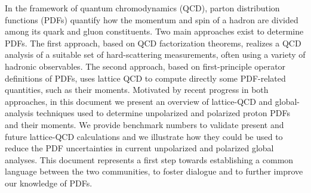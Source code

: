 \documentclass[twoside,12pt]{article}
\numberwithin{equation}{section}
\numberwithin{figure}{section}
\numberwithin{table}{section}
\begin{document}
\vspace{-0.4cm}
In the framework of quantum chromodynamics (QCD), parton distribution 
functions (PDFs) quantify how the momentum and spin of a hadron are divided 
among its quark and gluon constituents.
%
Two main approaches exist to determine PDFs.
%
The first approach, based on QCD factorization theorems, realizes a QCD 
analysis of a suitable set of hard-scattering measurements, often using a 
variety of hadronic observables.
%
The second approach, based on first-principle operator definitions of PDFs,
uses lattice QCD to compute directly some PDF-related quantities, such 
as their moments.
%
Motivated by recent progress in both approaches, in this document we present
an overview of lattice-QCD and global-analysis techniques used to 
determine unpolarized and polarized proton PDFs and their moments. 
%
We provide benchmark numbers to validate present and future lattice-QCD 
calculations and we illustrate how they could be used to reduce
the PDF uncertainties in current unpolarized and polarized global analyses.
%
This document represents a first step towards establishing a common
language between the two communities, to foster dialogue and
to further improve our knowledge of PDFs.
\vspace{-0.5cm}

\tableofcontents













\appendix




\clearpage %


\clearpage %

\newpage %

\end{document}
